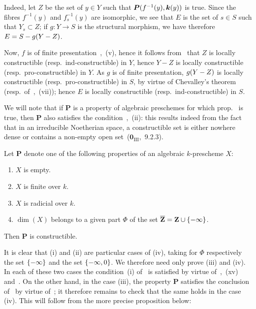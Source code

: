Indeed, let $Z$ be the set of $y\in Y$ such that $\boldsymbol{P}(f^{-1}(y),\boldsymbol{k}(y))$ is true.
Since the fibres $f^{-1}(y)$ and $f_s^{-1}(y)$ are isomorphic, we see that $E$ is the set of $s\in S$ such that $Y_s\subset Z$; if $g:Y\to S$ is the structural morphism, we have therefore $E=S- g(Y- Z)$.


Now, $f$ is of finite presentation~,~(v), hence it follows from~ that $Z$ is locally constructible (resp.\ ind-constructible) in $Y$, hence $Y-Z$ is locally constructible (resp.\ pro-constructible) in $Y$.
As $g$ is of finite presentation, $g(Y- Z)$ is locally constructible (resp.\ pro-constructible) in $S$, by virtue of Chevalley's theorem~ (resp.\ of~,~(vii)); hence $E$ is locally constructible (resp.\ ind-constructible) in $S$.

\begin{remark}[9.2.5]
\label{IV.9.2.5}
We will note that if $\boldsymbol{P}$ is a property of algebraic preschemes for which prop.~ is true, then $\boldsymbol{P}$ also satisfies the condition~,~(ii): this results indeed from the fact that in an irreducible Noetherian space, a constructible set is either nowhere dense or contains a non-empty open set~($\mathbf{0}_{\mathrm{III}}$,~9.2.3).
\end{remark}

\begin{proposition}[9.2.6]
\label{IV.9.2.6}
Let $\boldsymbol{P}$ denote one of the following properties of an algebraic $k$-prescheme $X$:
\begin{enumerate}[label=\textup{(\roman*)}]
  \item $X$ is empty.
  \item $X$ is finite over $k$.
  \item $X$ is radicial over $k$.
  \item $\dim(X)$ belongs to a given part $\Phi$ of the set $\overline{\mathbf{Z}}=\mathbf{Z}\cup\{-\infty\}$.
\end{enumerate}
Then $\boldsymbol{P}$ is constructible.
\end{proposition}

It is clear that (i) and (ii) are particular cases of (iv), taking for $\Phi$ respectively the set $\{-\infty\}$ and the set $\{-\infty,0\}$.
We therefore need only prove (iii) and (iv).
In each of these two cases the condition~(i) of~ is satisfied by virtue of~,~(xv) and~.
On the other hand, in the case (iii), the property $\boldsymbol{P}$ satisfies the conclusion of~ by virtue of~; it therefore remains to check that the same holds in the case (iv).
This will follow from the more precise proposition below:

